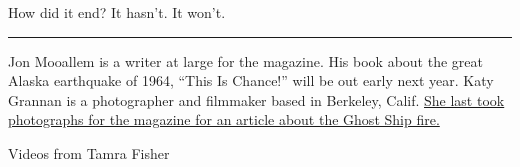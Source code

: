 How did it end? It hasn't. It won't.

\begin{center}\rule{0.5\linewidth}{\linethickness}\end{center}

Jon Mooallem is a writer at large for the magazine. His book about the
great Alaska earthquake of 1964, ``This Is Chance!'' will be out early
next year. Katy Grannan is a photographer and filmmaker based in
Berkeley, Calif.
\href{https://www.nytimes.com/2018/12/12/magazine/oakland-warehouse-fire-ghost-ship.html}{She
last took photographs for the magazine for an article about the Ghost
Ship fire.}

Videos from Tamra Fisher

\subsection{}

